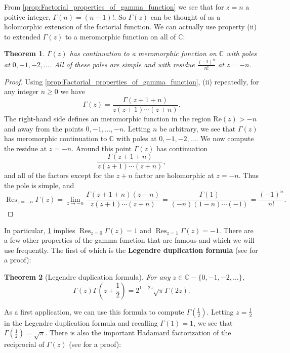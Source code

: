 \documentclass[12pt]{book}
\newtheorem{theorem}{Theorem}[section]
\theoremstyle{definition}\newframedtheorem{method}{Method}
\newcommand{\C}{\mathbb{C}}
\newcommand{\G}{\Gamma}
\newcommand{\<}{\langle}
\renewcommand{\>}{\rangle}
\DeclareMathOperator*{\Res}{\mathrm{Res}}
\renewcommand{\Re}{\mathrm{Re}}
\begin{document}
    From \cref{prop:Factorial_properties_of_gamma_function} we see that for $z = n$ a poitive integer, $\G(n) = (n-1)!$. So $\G(z)$ can be thought of as a holomorphic extension of the factorial function. We can actually use property (ii) to extended $\G(z)$ to a meromorphic function on all of $\C$:

    \begin{theorem}\label{thm:continuation_of_gamma_function}
      $\G(z)$ has continuation to a meromorphic function on $\C$ with poles at $0,-1,-2,\ldots$. All of these poles are simple and with residue $\frac{(-1)^{n}}{n!}$ at $z = -n$.
    \end{theorem}
    \begin{proof}
      Using \cref{prop:Factorial_properties_of_gamma_function}, (ii) repeatedly, for any integer $n \ge 0$ we have
      \[
        \G(z) = \frac{\G(z+1+n)}{z(z+1) \cdots (z+n)}.
      \]
      The right-hand side defines an meromorphic function in the region $\Re(z) > -n$ and away from the points $0,-1,\ldots,-n$. Letting $n$ be arbitrary, we see that $\G(z)$ has meromorphic continuation to $\C$ with poles at $0,-1,-2,\ldots$. We now compute the residue at $z = -n$. Around this point $\G(z)$ has continuation
      \[
        \frac{\G(z+1+n)}{z(z+1) \cdots (z+n)},
      \]
      and all of the factors except for the $z+n$ factor are holomorphic at $z = -n$. Thus the pole is simple, and
      \[
        \Res_{z = -n}\G(z) = \lim_{z \to -n}\frac{\G(z+1+n)(z+n)}{z(z+1) \cdots (z+n)} = \frac{\G(1)}{(-n)(1-n) \cdots (-1)} = \frac{(-1)^{n}}{n!}.
      \]
    \end{proof}

    In particular, \cref{thm:continuation_of_gamma_function} implies $\Res_{z = 0}\G(z) = 1$ and $\Res_{z = 1}\G(z) = -1$. There are a few other properties of the gamma function that are famous and which we will use frequently. The first of which is the \textbf{Legendre duplication formula} (see \cite{remmert2013classical} for a proof):

    \begin{theorem}[Legendre duplication formula]
      For any $z \in \C-\{0,-1,-2,\ldots\}$,
      \[
        \G(z)\G\left(z+\frac{1}{2}\right) = 2^{1-2z}\sqrt{\pi}\G(2z).
      \]
    \end{theorem}

    As a first application, we can use this formula to compute $\G\left(\frac{1}{2}\right)$. Letting $z = \frac{1}{2}$ in the Legendre duplication formula and recalling $\G(1) = 1$, we see that $\G\left(\frac{1}{2}\right) = \sqrt{\pi}$. There is also the important Hadamard factorization of the reciprocial of $\G(z)$ (see \cite{stein2010complex} for a proof):
\end{document}
